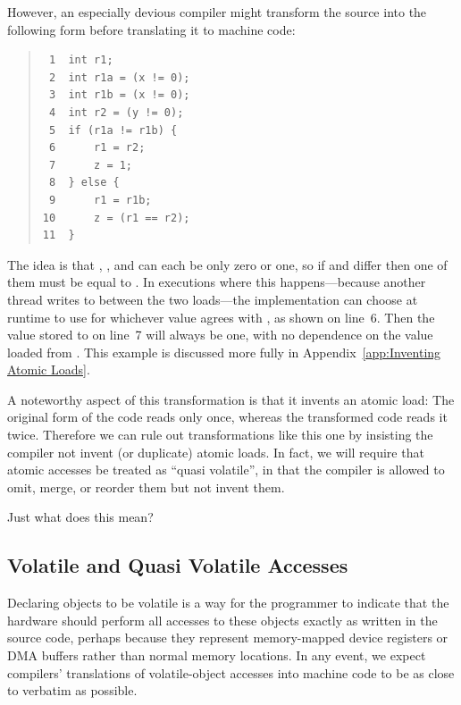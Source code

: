 \documentclass[10]{article}
\begin{document}
However, an especially devious compiler might transform the source into
the following form before translating it to machine code:
\begin{quote}
\begin{verbatim}
 1  int r1;
 2  int r1a = (x != 0);
 3  int r1b = (x != 0);
 4  int r2 = (y != 0);
 5  if (r1a != r1b) {
 6      r1 = r2;
 7      z = 1;
 8  } else {
 9      r1 = r1b;
10      z = (r1 == r2);
11  }
\end{verbatim}
\end{quote}
The idea is that , , and  can each be only zero or one,
so if  and  differ then one of them must be equal to .
In executions where this happens---because another thread writes to 
between the two loads---the implementation can choose at runtime to use
for  whichever value agrees with , as shown on line~6.
Then the value stored to  on line~7 will always be one,
with no dependence on the value loaded from .
This example is discussed more fully in
Appendix~\ref{app:Inventing Atomic Loads}.

A noteworthy aspect of this transformation is that it invents an atomic load:
The original form of the code reads  only once,
whereas the transformed code reads it twice.
Therefore we can rule out transformations like this one by insisting
the compiler not invent (or duplicate) atomic loads.
In fact, we will require that atomic accesses be treated as
``quasi volatile'', in that the compiler is allowed to omit,
merge, or reorder them but not invent them.

Just what does this mean?

\subsection{Volatile and Quasi Volatile Accesses}
\label{sec:Volatile and Quasi Volatile Accesses}

Declaring objects to be volatile is a way for the programmer to
indicate that the hardware should perform all accesses to these
objects exactly as written in the source code, perhaps because they
represent memory-mapped device registers or DMA buffers rather than
normal memory locations.
In any event, we expect compilers' translations of volatile-object accesses
into machine code to be as close to verbatim as possible.
\end{document}
